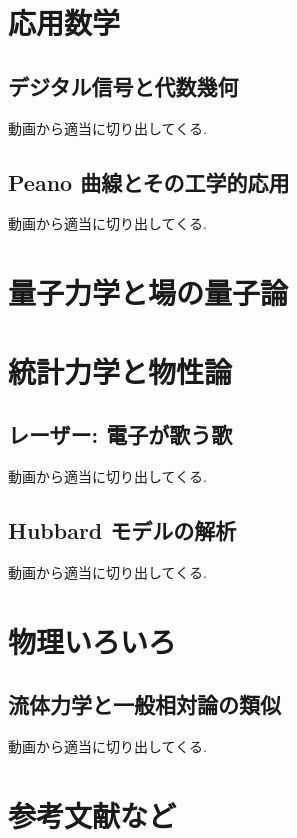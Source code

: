 \documentclass[openany, a4paper, oneside]{jsbook}
\theoremstyle{break}
\theoremstyle{breakdefn}
\begin{document}
\part{応用数学}

\chapter{デジタル信号と代数幾何}


動画から適当に切り出してくる.
\chapter{Peano 曲線とその工学的応用}


動画から適当に切り出してくる.
\part{量子力学と場の量子論}

\part{統計力学と物性論}

\chapter{レーザー: 電子が歌う歌}


動画から適当に切り出してくる.
\chapter{Hubbard モデルの解析}


動画から適当に切り出してくる.
\part{物理いろいろ}

\chapter{流体力学と一般相対論の類似}


動画から適当に切り出してくる.
\part{参考文献など}


\nocite{*}
\printindex

\end{document}
